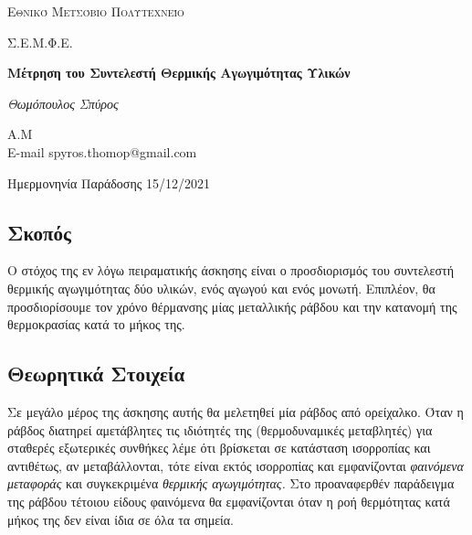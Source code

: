 \documentclass[a4paper]{article}
\begin{document}
\begin{titlepage}			%
	\centering
	{\scshape\LARGE Εθνικό Μετσόβιο Πολυτεχνείο\par}
	{\scshape \LARGE Σ.Ε.Μ.Φ.Ε.\par}
	\vspace{1cm}
	{\huge\bfseries Μέτρηση του Συντελεστή Θερμικής Αγωγιμότητας Υλικών \par}
	\vspace{1cm}
	{\Large\itshape Θωμόπουλος Σπύρος\par}		%
	
	{\large A.M  \hfill \\ E-mail spyros.thomop@gmail.com \\}%
	\vspace{1cm}
	{\large Ημερμονηνία Παράδοσης 15/12/2021\par}
\end{titlepage}


\newpage 

\subsection*{Σκοπός}

Ο στόχος της εν λόγω πειραματικής άσκησης είναι ο προσδιορισμός του συντελεστή θερμικής αγωγιμότητας δύο υλικών, ενός αγωγού και ενός μονωτή. Επιπλέον, θα προσδιορίσουμε τον χρόνο θέρμανσης μίας μεταλλικής ράβδου και την κατανομή της θερμοκρασίας κατά το μήκος της.

\subsection*{Θεωρητικά Στοιχεία}

Σε μεγάλο μέρος της άσκησης αυτής θα μελετηθεί μία ράβδος από ορείχαλκο. Όταν η ράβδος διατηρεί αμετάβλητες τις ιδιότητές της (θερμοδυναμικές μεταβλητές) για σταθερές εξωτερικές συνθήκες λέμε ότι βρίσκεται σε κατάσταση ισορροπίας και αντιθέτως, αν μεταβάλλονται, τότε είναι εκτός ισορροπίας και εμφανίζονται \textit{φαινόμενα μεταφοράς} και συγκεκριμένα \textit{θερμικής αγωγιμότητας.} Στο προαναφερθέν παράδειγμα της ράβδου τέτοιου είδους φαινόμενα θα εμφανίζονται όταν η ροή θερμότητας κατά μήκος της δεν είναι ίδια σε όλα τα σημεία.
\end{document}
